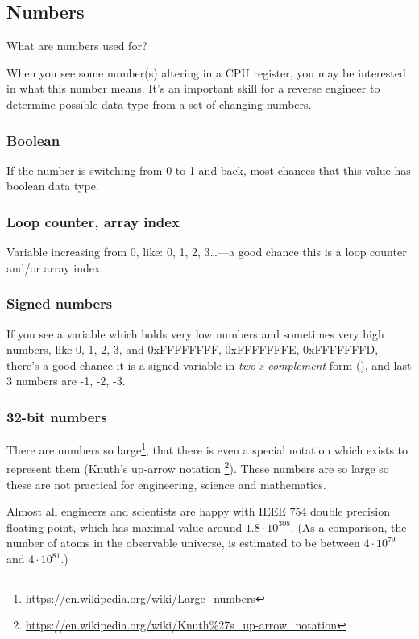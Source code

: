 \subsection{Numbers}

What are numbers used for?

When you see some number(s) altering in a CPU register, you may be interested in what this number means.
It's an important skill for a reverse engineer to determine possible data type from a set of changing numbers.

\subsubsection{Boolean}

If the number is switching from 0 to 1 and back, most chances that this value has boolean data type.

\subsubsection{Loop counter, array index}

Variable increasing from 0, like: 0, 1, 2, 3\dots---a good chance this is a loop counter and/or array index.

\subsubsection{Signed numbers}

If you see a variable which holds very low numbers and sometimes very high numbers,
like 0, 1, 2, 3, and 0xFFFFFFFF, 0xFFFFFFFE, 0xFFFFFFFD,
there's a good chance it is a signed variable in \emph{two's complement} form (),
and last 3 numbers are -1, -2, -3.

\subsubsection{32-bit numbers}

There are numbers so large\footnote{\url{https://en.wikipedia.org/wiki/Large_numbers}},
that there is even a special notation which exists to represent them (Knuth's up-arrow notation
\footnote{\url{https://en.wikipedia.org/wiki/Knuth\%27s_up-arrow_notation}}).
These numbers are so large so these are not practical for engineering, science and mathematics.

Almost all engineers and scientists are happy with IEEE 754 double precision floating point, which has maximal
value around $1.8 \cdot 10^{308}$.
(As a comparison, the number of atoms in the observable universe, is estimated to be between
$4 \cdot 10^{79}$ and $4 \cdot 10^{81}$.)

